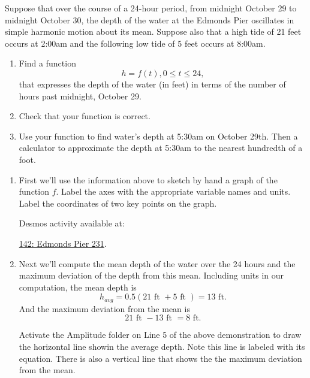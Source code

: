 \documentclass{ximera}
\begin{document}
\begin{example} \label{Efdgu7u67}
Suppose that over the course of a 24-hour period, from midnight October 29 to midnight October 30, the depth of the water at the Edmonds Pier oscillates in simple harmonic motion about its mean. Suppose also that a high tide of 21 feet occurs at 2:00am and the following low tide of 5 feet occurs at 8:00am. 

\begin{enumerate}

\item Find a function
\[
    h = f(t) , 0\leq t \leq 24, 
\]
that expresses the depth of the water (in feet) in terms of the number of hours past midnight, October 29. 

\item Check that your function is correct.

\item Use your function to find water's depth at 5:30am on October 29th. Then a calculator to approximate the depth at 5:30am to the nearest hundredth of a foot.

\end{enumerate}

\begin{explanation}
\begin{enumerate}
\item  First we'll use the information above to sketch by hand a graph of the function $f$. Label the axes with the appropriate variable names and units. Label the coordinates of two key points on the graph.

Desmos activity available at:

\href{https://www.desmos.com/calculator/2mpr2yod3y}{142: Edmonds Pier 231}.

 
\begin{onlineOnly}
    \begin{center}
\end{center}
\end{onlineOnly}

\item Next we'll compute the mean depth of the water over the 24 hours and the maximum deviation of the depth from this mean. Including units in our computation, the mean depth is 
\[
    h_{avg} = 0.5 ( 21 \text{ ft } + 5 \text{ ft }) = 13 \text{ ft} . 
\]
And the maximum deviation from the mean is
\[
     21 \text{ ft } - 13 \text{ ft } = 8 \text{ ft}.
\]

Activate the Amplitude folder on Line 5 of the above demonstration to draw the horizontal line showin the average depth. Note this line is labeled with its equation. There is also a vertical line that shows the the maximum deviation from the mean.


\end{enumerate}
\end{explanation}
\end{example}
\end{document}
